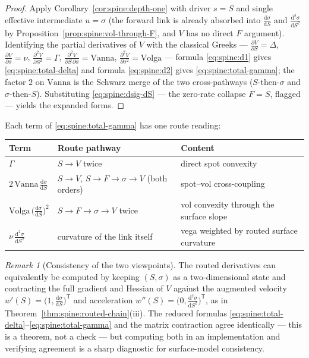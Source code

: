 \documentclass[11pt]{book}
\theoremstyle{plain}
\theoremstyle{definition}
\theoremstyle{remark}
\newtheorem{remark}[theorem]{Remark}
\newcommand{\vega}{\nu}                          %
\newcommand{\Vanna}{\mathrm{Vanna}}
\newcommand{\Volga}{\mathrm{Volga}}
\newcommand{\dd}{\mathrm{d}}                                  %
\newcommand{\pd}[2]{\frac{\partial #1}{\partial #2}}          %
\newcommand{\pdd}[2]{\frac{\partial^2 #1}{\partial #2^2}}     %
\newcommand{\pdc}[3]{\frac{\partial^2 #1}{\partial #2\,\partial #3}} %
\newcommand{\td}[2]{\frac{\dd #1}{\dd #2}}                    %
\begin{document}
\begin{proof}
Apply Corollary~\ref{cor:spine:depth-one} with driver $s = S$ and single
effective intermediate $u = \sigma$ (the forward link is already absorbed into
$\td{\sigma}{S}$ and $\frac{\dd^2\sigma}{\dd S^2}$ by
Proposition~\ref{prop:spine:vol-through-F}, and $V$ has no direct $F$
argument). Identifying the partial derivatives of $V$ with the classical
Greeks --- $\pd{V}{S} = \Delta$, $\pd{V}{\sigma} = \vega$,
$\pdd{V}{S} = \Gamma$, $\pdc{V}{S}{\sigma} = \Vanna$,
$\pdd{V}{\sigma} = \Volga$ --- formula \eqref{eq:spine:d1} gives
\eqref{eq:spine:total-delta} and formula \eqref{eq:spine:d2} gives
\eqref{eq:spine:total-gamma}; the factor $2$ on $\Vanna$ is the Schwarz merge
of the two cross-pathways ($S$-then-$\sigma$ and $\sigma$-then-$S$).
Substituting \eqref{eq:spine:dsig-dS} --- the zero-rate collapse $F = S$,
flagged --- yields the expanded forms.
\end{proof}

Each term of \eqref{eq:spine:total-gamma} has one route reading:

\begin{center}
\renewcommand{\arraystretch}{1.35}
\begin{tabular}{@{}lll@{}}
\toprule
Term & Route pathway & Content \\
\midrule
$\Gamma$ & $S \to V$ twice & direct spot convexity \\
$2\,\Vanna\,\td{\sigma}{S}$ & $S \to V$, $S \to F \to \sigma \to V$ (both orders) & spot--vol cross-coupling \\
$\Volga\,\bigl(\td{\sigma}{S}\bigr)^2$ & $S \to F \to \sigma \to V$ twice & vol convexity through the surface slope \\
$\vega\,\frac{\dd^2\sigma}{\dd S^2}$ & curvature of the link itself & vega weighted by routed surface curvature \\
\bottomrule
\end{tabular}
\end{center}

\begin{remark}[Consistency of the two viewpoints]\label{rem:spine:two-views}
The routed derivatives can equivalently be computed by keeping
$(S, \sigma)$ as a two-dimensional state and contracting the full gradient and
Hessian of $V$ against the augmented velocity
$w'(S) = \bigl(1, \td{\sigma}{S}\bigr)^{\mathsf T}$ and acceleration
$w''(S) = \bigl(0, \frac{\dd^2\sigma}{\dd S^2}\bigr)^{\mathsf T}$, as in
Theorem~\ref{thm:spine:routed-chain}(iii). The reduced formulas
\eqref{eq:spine:total-delta}--\eqref{eq:spine:total-gamma} and the
matrix contraction agree identically --- this is a theorem, not a check ---
but computing both in an implementation and verifying agreement is a sharp
diagnostic for surface-model consistency.
\end{remark}
\end{document}
